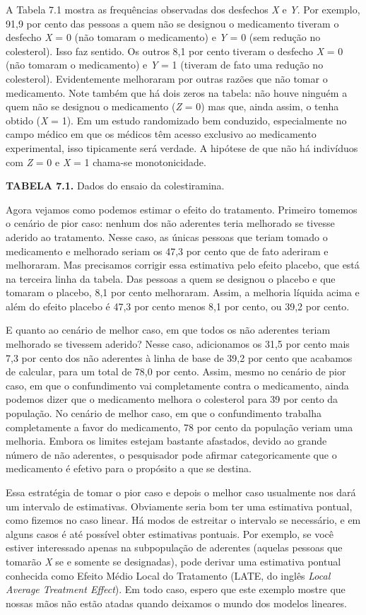 \documentclass[11pt,a5paper,twoside]{book}
\begin{document}
A Tabela 7.1 mostra as frequências observadas dos desfechos \textit{X} e \textit{Y}. Por exemplo, 91,9 por cento das pessoas a quem não se designou o medicamento tiveram o desfecho \textit{X} = 0 (não tomaram o medicamento) e \textit{Y} = 0 (sem redução no colesterol). Isso faz sentido. Os outros 8,1 por cento tiveram o desfecho \textit{X} = 0 (não tomaram o medicamento) e \textit{Y} = 1 (tiveram de fato uma redução no colesterol). Evidentemente melhoraram por outras razões que não tomar o medicamento. Note também que há dois zeros na tabela: não houve ninguém a quem não se designou o medicamento (\textit{Z} = 0) mas que, ainda assim, o tenha obtido (\textit{X} = 1). Em um estudo randomizado bem conduzido, especialmente no campo médico em que os médicos têm acesso exclusivo ao medicamento experimental, isso tipicamente será verdade. A hipótese de que não há indivíduos com \textit{Z} = 0 e \textit{X} = 1 chama-se monotonicidade.

\textbf{TABELA 7.1.} Dados do ensaio da colestiramina.

Agora vejamos como podemos estimar o efeito do tratamento. Primeiro tomemos o cenário de pior caso: nenhum dos não aderentes teria melhorado se tivesse aderido ao tratamento. Nesse caso, as únicas pessoas que teriam tomado o medicamento e melhorado seriam os 47,3 por cento que de fato aderiram e melhoraram. Mas precisamos corrigir essa estimativa pelo efeito placebo, que está na terceira linha da tabela. Das pessoas a quem se designou o placebo e que tomaram o placebo, 8,1 por cento melhoraram. Assim, a melhoria líquida acima e além do efeito placebo é 47,3 por cento menos 8,1 por cento, ou 39,2 por cento.

E quanto ao cenário de melhor caso, em que todos os não aderentes teriam melhorado se tivessem aderido? Nesse caso, adicionamos os 31,5 por cento mais 7,3 por cento dos não aderentes à linha de base de 39,2 por cento que acabamos de calcular, para um total de 78,0 por cento. Assim, mesmo no cenário de pior caso, em que o confundimento vai completamente contra o medicamento, ainda podemos dizer que o medicamento melhora o colesterol para 39 por cento da população. No cenário de melhor caso, em que o confundimento trabalha completamente a favor do medicamento, 78 por cento da população veriam uma melhoria. Embora os limites estejam bastante afastados, devido ao grande número de não aderentes, o pesquisador pode afirmar categoricamente que o medicamento é efetivo para o propósito a que se destina.

Essa estratégia de tomar o pior caso e depois o melhor caso usualmente nos dará um intervalo de estimativas. Obviamente seria bom ter uma estimativa pontual, como fizemos no caso linear. Há modos de estreitar o intervalo se necessário, e em alguns casos é até possível obter estimativas pontuais. Por exemplo, se você estiver interessado apenas na subpopulação de aderentes (aquelas pessoas que tomarão \textit{X} se e somente se designadas), pode derivar uma estimativa pontual conhecida como Efeito Médio Local do Tratamento (LATE, do inglês \textit{Local Average Treatment Effect}). Em todo caso, espero que este exemplo mostre que nossas mãos não estão atadas quando deixamos o mundo dos modelos lineares.
\end{document}
